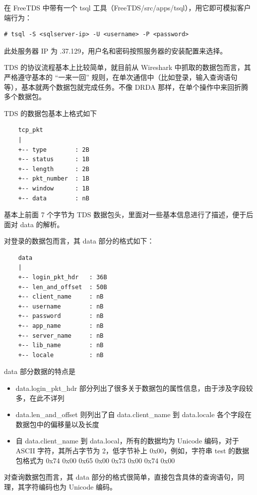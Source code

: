 在 FreeTDS 中带有一个 {\cmdf tsql} 工具（{\ff FreeTDS/src/apps/tsql}），用它即可模拟客户端行为：

\begin{lstlisting}
# tsql -S <sqlserver-ip> -U <username> -P <password>
\end{lstlisting}

此处服务器 IP 为 {.37.129}，用户名和密码按照服务器的安装配置来选择。

TDS 的协议流程基本上比较简单，就目前从 Wireshark 中抓取的数据包而言，其严格遵守基本的 ``一来一回'' 规则，在单次通信中（比如登录，输入查询语句等），基本就两个数据包就完成任务。不像 DRDA 那样，在单个操作中来回折腾多个数据包。

TDS 的数据包基本上格式如下

\begin{lstlisting}
    tcp_pkt
    |
    +-- type        : 2B
    +-- status      : 1B
    +-- length      : 2B
    +-- pkt_number  : 1B
    +-- window      : 1B
    +-- data        : nB
\end{lstlisting}

基本上前面 7 个字节为 TDS 数据包头，里面对一些基本信息进行了描述，便于后面对 {\cf data} 的解析。

对登录的数据包而言，其 {\cf data} 部分的格式如下：

\begin{lstlisting}
    data
    |
    +-- login_pkt_hdr   : 36B
    +-- len_and_offset  : 50B
    +-- client_name     : nB
    +-- username        : nB
    +-- password        : nB
    +-- app_name        : nB
    +-- server_name     : nB
    +-- lib_name        : nB
    +-- locale          : nB
\end{lstlisting}

{\cf data} 部分数据的特点是

\begin{itemize}
    \item {\cf data.login\_pkt\_hdr} 部分列出了很多关于数据包的属性信息，由于涉及字段较多，在此不详列
    \item {\cf data.len\_and\_offset} 则列出了自 {\cf data.client\_name} 到 {\cf data.locale} 各个字段在数据包中的偏移量以及长度
    \item 自 {\cf data.client\_name} 到 {\cf data.local}，所有的数据均为 Unicode 编码，对于 ASCII 字符，其所占字节为 2，低字节补上 {\cf 0x00}，例如，字符串 {\cf test} 的数据包格式为 {\cf 0x74 0x00 0x65 0x00 0x73 0x00 0x74 0x00}
\end{itemize}

对查询数据包而言，其 {\cf data} 部分的格式很简单，直接包含具体的查询语句，同理，其字符编码也为 Unicode 编码。

